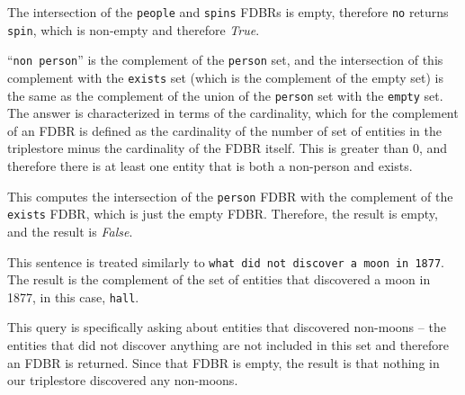 \documentclass[../main.tex]{subfiles}
\begin{document}
\begin{refsection}
\examplespacing


\examplespacing

\noindent The intersection of the \texttt{people} and \texttt{spins} FDBRs is empty, therefore \texttt{no} returns \texttt{spin}, which is non-empty and therefore \textit{True}.


\examplespacing

\noindent ``\texttt{non person}'' is the complement of the \texttt{person} set, and the intersection of this complement with the \texttt{exists} set (which is the complement of the empty set) is the same as the complement of the union of the \texttt{person} set with the \texttt{empty} set.  The answer is characterized in terms of the cardinality, which for the complement of an FDBR is defined as the cardinality of the number of set of entities in the triplestore minus the cardinality of the FDBR itself.  This is greater than 0, and therefore there is at least one entity that is both a non-person and exists.

\examplespacing


\examplespacing

\noindent This computes the intersection of the \texttt{person} FDBR with the complement of the \texttt{exists} FDBR, which is just the empty FDBR.  Therefore, the result is empty, and the result is \textit{False}.

\examplespacing


\examplespacing

\noindent This sentence is treated similarly to \texttt{what did not discover a moon in 1877}.  The result is the complement of the set of entities that discovered a moon in 1877, in this case, \texttt{hall}.

\examplespacing


\examplespacing

\noindent This query is specifically asking about entities that discovered non-moons -- the entities that did not discover anything are not included in this set and therefore an FDBR is returned.  Since that FDBR is empty, the result is that nothing in our triplestore discovered any non-moons.


\end{refsection}
\end{document}
